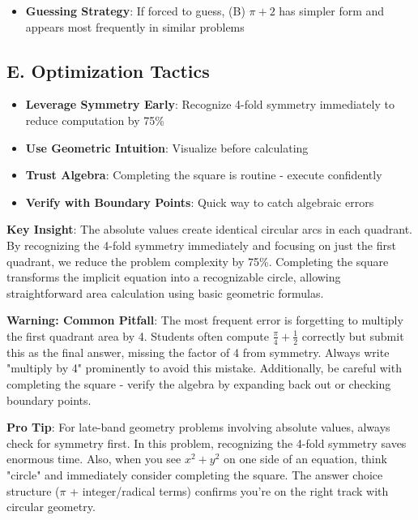 \documentclass[]{article}
\begin{document}
\begin{competitionbox}
\begin{itemize}[leftmargin=*]
    \item \textbf{Guessing Strategy}: If forced to guess, (B) $\pi + 2$ has simpler form and appears most frequently in similar problems
\end{itemize}

\subsection*{E. Optimization Tactics}
\begin{itemize}[leftmargin=*]
    \item \textbf{Leverage Symmetry Early}: Recognize 4-fold symmetry immediately to reduce computation by 75\%
    \item \textbf{Use Geometric Intuition}: Visualize before calculating
    \item \textbf{Trust Algebra}: Completing the square is routine - execute confidently
    \item \textbf{Verify with Boundary Points}: Quick way to catch algebraic errors
\end{itemize}
\end{competitionbox}

\begin{keyinsightbox}
\textbf{Key Insight}: The absolute values create identical circular arcs in each quadrant. By recognizing the 4-fold symmetry immediately and focusing on just the first quadrant, we reduce the problem complexity by 75\%. Completing the square transforms the implicit equation into a recognizable circle, allowing straightforward area calculation using basic geometric formulas.
\end{keyinsightbox}

\begin{warningbox}
\textbf{Warning: Common Pitfall}: The most frequent error is forgetting to multiply the first quadrant area by 4. Students often compute $\frac{\pi}{4} + \frac{1}{2}$ correctly but submit this as the final answer, missing the factor of 4 from symmetry. Always write "multiply by 4" prominently to avoid this mistake. Additionally, be careful with completing the square - verify the algebra by expanding back out or checking boundary points.
\end{warningbox}

\begin{tipbox}
\textbf{Pro Tip}: For late-band geometry problems involving absolute values, always check for symmetry first. In this problem, recognizing the 4-fold symmetry saves enormous time. Also, when you see $x^2 + y^2$ on one side of an equation, think "circle" and immediately consider completing the square. The answer choice structure ($\pi$ + integer/radical terms) confirms you're on the right track with circular geometry.
\end{tipbox}
\end{document}
